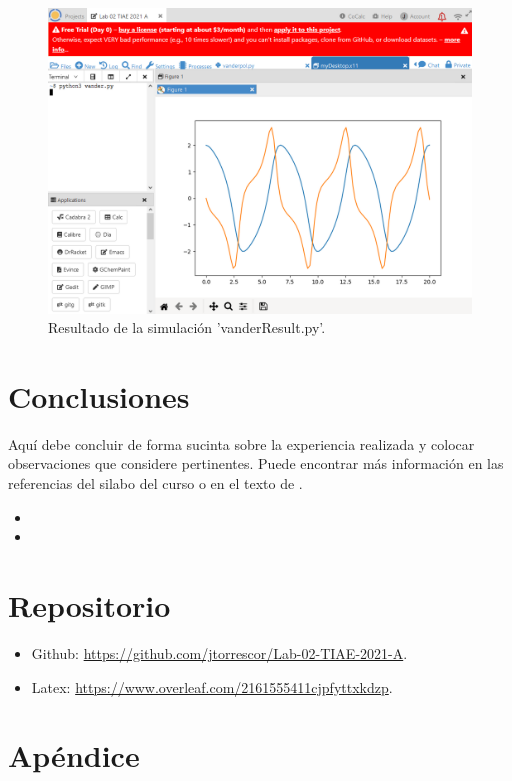 \documentclass[12pt,oneside,spanish]{article}
\begin{document}
\begin{figure}
    \centering
    \includegraphics[width=12cm]{vanderResult.png}
    \caption{Resultado de la simulación 'vanderResult.py'.}
    \label{fig:vanderResult}
\end{figure}

\section{Conclusiones}
Aquí debe concluir de forma sucinta sobre la experiencia realizada y colocar observaciones que considere pertinentes.
Puede encontrar más información en las referencias del silabo del curso o en el texto de \cite{Triantafyllou:2002,fossen:2011}.
\begin{itemize}
    \item 
    \item
\end{itemize}
\section{Repositorio}
\begin{itemize}
    \item Github: 
    \url{https://github.com/jtorrescor/Lab-02-TIAE-2021-A}.
    \item Latex: 
    \url{https://www.overleaf.com/2161555411cjpfyttxkdzp}.
\end{itemize}
\newpage
%

\appendix

\newpage
{} %
\section*{Apéndice}
\end{document}
